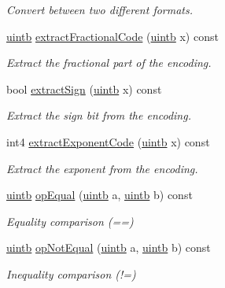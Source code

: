 \begin{DoxyCompactItemize}
\begin{DoxyCompactList}\small\item\em Convert between two different formats. \end{DoxyCompactList}\item 
\mbox{\hyperlink{types_8h_a2db313c5d32a12b01d26ac9b3bca178f}{uintb}} \mbox{\hyperlink{class_float_format_af06109651ce301156e5a384c946e7780}{extract\+Fractional\+Code}} (\mbox{\hyperlink{types_8h_a2db313c5d32a12b01d26ac9b3bca178f}{uintb}} x) const
\begin{DoxyCompactList}\small\item\em Extract the fractional part of the encoding. \end{DoxyCompactList}\item 
bool \mbox{\hyperlink{class_float_format_afa7d38ddb73a8cd9f4d29b839af04d1d}{extract\+Sign}} (\mbox{\hyperlink{types_8h_a2db313c5d32a12b01d26ac9b3bca178f}{uintb}} x) const
\begin{DoxyCompactList}\small\item\em Extract the sign bit from the encoding. \end{DoxyCompactList}\item 
int4 \mbox{\hyperlink{class_float_format_a266d06329a88845bbc202b87141f64df}{extract\+Exponent\+Code}} (\mbox{\hyperlink{types_8h_a2db313c5d32a12b01d26ac9b3bca178f}{uintb}} x) const
\begin{DoxyCompactList}\small\item\em Extract the exponent from the encoding. \end{DoxyCompactList}\item 
\mbox{\hyperlink{types_8h_a2db313c5d32a12b01d26ac9b3bca178f}{uintb}} \mbox{\hyperlink{class_float_format_a1c59c49b0bdbc8d31d2df59eb0624d06}{op\+Equal}} (\mbox{\hyperlink{types_8h_a2db313c5d32a12b01d26ac9b3bca178f}{uintb}} a, \mbox{\hyperlink{types_8h_a2db313c5d32a12b01d26ac9b3bca178f}{uintb}} b) const
\begin{DoxyCompactList}\small\item\em Equality comparison (==) \end{DoxyCompactList}\item 
\mbox{\hyperlink{types_8h_a2db313c5d32a12b01d26ac9b3bca178f}{uintb}} \mbox{\hyperlink{class_float_format_a1f28cec1861ddf0f416033f971a43b16}{op\+Not\+Equal}} (\mbox{\hyperlink{types_8h_a2db313c5d32a12b01d26ac9b3bca178f}{uintb}} a, \mbox{\hyperlink{types_8h_a2db313c5d32a12b01d26ac9b3bca178f}{uintb}} b) const
\begin{DoxyCompactList}\small\item\em Inequality comparison (!=) \end{DoxyCompactList}\item 

\end{DoxyCompactItemize}
